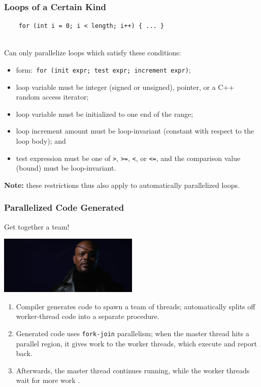 \begin{frame}[fragile]
  \frametitle{Loops of a Certain Kind}

  
\begin{verbatim}
    for (int i = 0; i < length; i++) { ... }
\end{verbatim}~\\[1em]

    Can only parallelize loops which satisfy these conditions:
\begin{itemize}
\item form:~{\tt for (init expr; test expr; increment expr)};
\item loop variable must be integer (signed or unsigned), pointer, or a C++
random access iterator;
\item loop variable must be initialized to one end of the range;
\item loop increment amount must be loop-invariant (constant with respect to the loop body); and
\item test expression must be one of {\tt >}, {\tt >=}, {\tt <}, or {\tt <=}, and the comparison value (bound) must be loop-invariant.
\end{itemize}

{\bf Note:} these restrictions thus also apply to automatically parallelized
loops.


\end{frame}

\begin{frame}[containsverbatim]
  \frametitle{Parallelized Code Generated}
  
  Get together a team!
  
  \begin{center}
	\includegraphics[width=0.5\textwidth]{images/nickfury.png}
\end{center}

  \begin{enumerate}
    \item Compiler generates code to spawn a \alert{team}
of threads; automatically splits off worker-thread code into a
separate procedure.
    \item Generated code uses {\tt fork-join} parallelism; when the
master thread hits a parallel region, it gives work to the worker
threads, which execute and report back.
    \item Afterwards, the master thread
continues running, while the worker threads wait for more work .
  \end{enumerate}
\end{frame}


